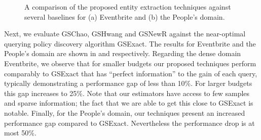 \begin{figure}[h]
\begin{center}
\end{center}
\vspace{-20pt}
\caption{A comparison of the proposed entity extraction techniques against several baselines for (a) Eventbrite and (b) the People's domain.}
\label{fig:resultsextr}
\vspace{-15pt}
\end{figure}

\vspace{2pt}
Next, we evaluate GSChao, GSHwang and GSNewR against the near-optimal querying policy discovery algorithm GSExact. The results for Eventbrite and the People's domain are shown in  and  respectively. Regarding the dense domain Eventbrite, we observe that for smaller budgets our proposed techniques perform comparably to GSExact that has ``perfect information'' to the gain of each query, typically demonstrating a performance gap of less than 10\%. For larger budgets this gap increases to 25\%. Note that our estimators have access to few samples and sparse information; the fact that we are able to get this close to GSExact is notable. Finally, for the People's domain, our techniques present an increased performance gap compared to GSExact. Nevertheless the performance drop is at most 50\%. 


